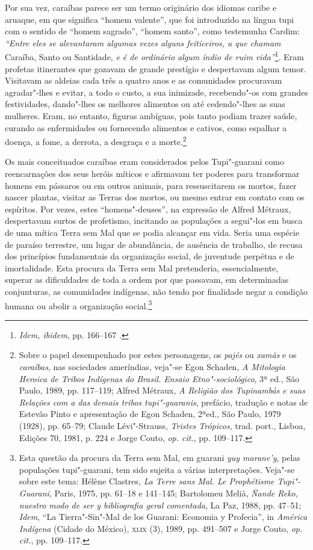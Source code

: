 Por sua vez, caraíbas parece ser um termo originário dos
idiomas caribe e aruaque, em que significa ``homem valente'', que foi
introduzido na língua tupi com o sentido de ``homem sagrado'', ``homem
santo'', como testemunha Cardim: \textit{``Entre eles se
alevantaram algumas vezes alguns feiticeiros, a que chamam} Caraíba,
Santo ou Santidade, \textit{e é de ordinário algum índio de ruim 
vida''}\footnote{ \textit{Idem, ibidem}, pp. 166--167 .}. Eram profetas
itinerantes que gozavam de grande prestígio e despertavam algum temor.
Visitavam as aldeias cada três a quatro anos e as comunidades
procuravam agradar"-lhes e evitar, a todo o custo, a sua inimizade,
recebendo"-os com grandes festividades, dando"-lhes os melhores alimentos
ou até cedendo"-lhes as suas mulheres. Eram, no entanto, figuras
ambíguas, pois tanto podiam trazer saúde, curando as enfermidades ou
fornecendo alimentos e cativos, como espalhar a doença, a fome, a
derrota, a desgraça e a morte.\footnote{ Sobre o papel
desempenhado por estes personagens, os \textit{pajés} ou \textit{xamãs}
e os \textit{caraíbas}, nas sociedades ameríndias, veja"-se Egon
Schaden, \textit{A Mitologia Heroica de Tribos Indígenas do Brasil.
Ensaio Etno"-sociológico}, 3ª ed., São Paulo, 1989, pp. 117--119; Alfred
Métraux, \textit{A Religião dos Tupinambás e suas Relações com a das
demais tribos tupi"-guaranis}, prefácio, tradução e notas de Estevão
Pinto e apresentação de Egon Schaden, 2ªed., São Paulo, 1979 (1928),
pp. 65--79; Claude Lévi"-Strauss, \textit{Tristes Trópicos}, trad. port.,
Lisboa, Edições 70, 1981, p. 224 e Jorge Couto, \textit{op. cit.}, pp. 109--117.} 

 Os mais conceituados caraíbas eram considerados pelos
Tupi"-guarani como reencarnações dos seus heróis míticos e afirmavam
ter poderes para transformar homens em pássaros ou em outros animais,
para ressuscitarem os mortos, fazer nascer plantas, visitar as Terras
dos mortos, ou mesmo entrar em contato com os espíritos. Por vezes,
estes ``homens"-deuses'', na expressão de Alfred Métraux, despertavam
surtos de profetismo, incitando as populações a segui"-los em busca de
uma mítica Terra sem Mal que se podia alcançar em vida. Seria uma
espécie de paraíso terrestre, um lugar de abundância, de ausência de
trabalho, de recusa dos princípios fundamentais da organização social,
de juventude perpétua e de imortalidade. Esta procura da Terra sem Mal
pretenderia, essencialmente, superar as dificuldades de toda a ordem
por que passavam, em determinadas conjunturas, as comunidades indígenas,
não tendo por finalidade negar a condição humana ou abolir a
organização social.\footnote{ Esta questão da procura da Terra sem
Mal, em guarani \textit{yuy marane'y}, pelas populações tupi"-guarani, 
tem sido sujeita a várias interpretações. Veja"-se sobre este tema:
Hélène Clastres, \textit{La Terre sans Mal. Le Prophétisme
Tupi"-Guarani}, Paris, 1975, pp. 61--18 e 141--145; Bartolomeu Melià,
\textit{Ñande Reko, nuestro modo de ser y bibliografia geral comentada}, 
La Paz, 1988, pp. 47--51; \textit{Idem}, ``La Tierra"-Sin"-Mal de los Guarani:
Economia y Profecia'', in \textit{América Indígena} (Cidade do México),
\textsc{xlix} (3), 1989, pp. 491--507 e Jorge Couto, \textit{op. cit.}, pp. 109--117.} 

